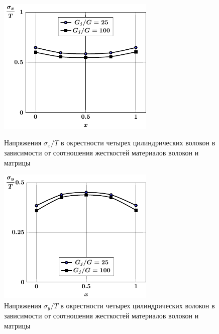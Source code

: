 \begin{russian}
\begin{figure}[h!]
\centering\footnotesize
\parbox[b]{7.5cm}{\centering\includegraphics[width=7.5cm]{inclusion-4-x-g.pdf}
\caption{Напряжения $\sigma_x/T$ в окрестности четырех цилиндрических волокон в зависимости от соотношения жесткостей материалов волокон и матрицы
\label{f:7:58}}}\hfil\hfil
\parbox[b]{7.5cm}{\centering\includegraphics[width=7.5cm]{inclusion-4-y-g.pdf}
\caption{Напряжения $\sigma_y/T$ в окрестности четырех цилиндрических волокон в зависимости от соотношения жесткостей материалов волокон и матрицы
\label{f:7:59}}}
\end{figure}

%


\end{russian}
